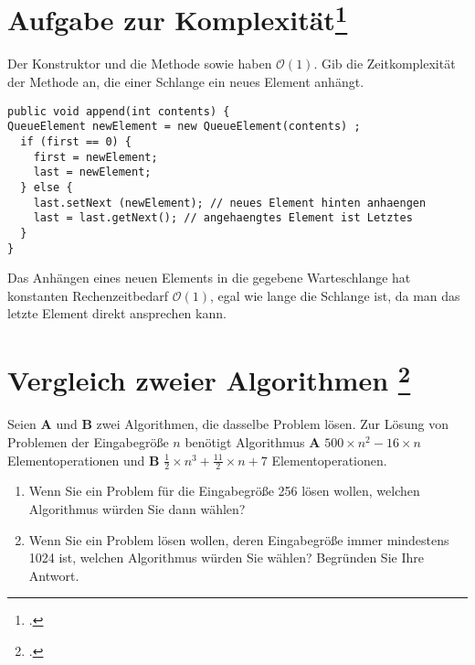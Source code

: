 \documentclass{lehramt-informatik-haupt}
\begin{document}
\section{Aufgabe zur Komplexität\footcite[Seite 3]{aud:pu:2}}

\noindent
Der Konstruktor  und die Methode
 sowie  haben $\mathcal{O}(1)$.
Gib die Zeitkomplexität der Methode  an, die
einer Schlange ein neues Element anhängt.

\begin{verbatim}
public void append(int contents) {
QueueElement newElement = new QueueElement(contents) ;
  if (first == 0) {
    first = newElement;
    last = newElement;
  } else {
    last.setNext (newElement); // neues Element hinten anhaengen
    last = last.getNext(); // angehaengtes Element ist Letztes
  }
}
\end{verbatim}

\begin{antwort}
Das Anhängen eines neuen Elements in die gegebene Warteschlange hat
konstanten Rechenzeitbedarf $\mathcal{O}(1)$, egal wie lange die
Schlange ist, da man das letzte Element direkt ansprechen kann.
\end{antwort}

%

\section{Vergleich zweier Algorithmen
\footcite[Seite 1, Aufgabe 1: Komplexität]{aud:ab:7}
}

Seien \textbf{A} und \textbf{B} zwei Algorithmen,
die dasselbe Problem lösen.
Zur Lösung von Problemen der Eingabegröße $n$ benötigt
Algorithmus \textbf{A} $500 \times n^2 - 16 \times n$ Elementoperationen
und
\textbf{B} $\frac{1}{2} \times n^3 + \frac{11}{2} \times  n + 7$
Elementoperationen.

\begin{enumerate}


\item Wenn Sie ein Problem für die Eingabegröße 256 lösen wollen,
welchen Algorithmus würden Sie dann wählen?


\item Wenn Sie ein Problem lösen wollen, deren Eingabegröße immer
mindestens 1024 ist, welchen Algorithmus würden Sie wählen? Begründen
Sie Ihre Antwort.

\end{enumerate}
\end{document}
